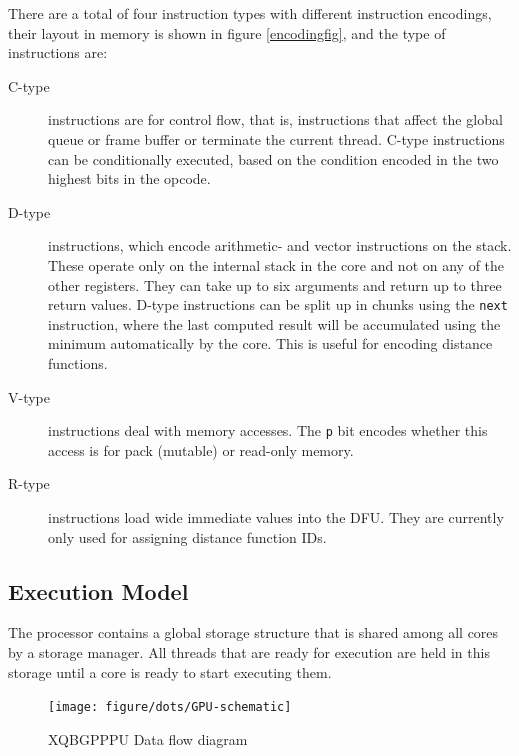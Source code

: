 			There are a total of four instruction types with different
			instruction encodings, their layout in memory is shown in figure
			\ref{encodingfig}, and the type of instructions are:

			\begin{description}
				\item[C-type] instructions are for control flow, that is, 
					instructions that affect the global queue or frame buffer or
					terminate the current thread. C-type instructions can be 
					conditionally executed, based on the condition encoded in
					the two highest bits in the opcode. 

				\item[D-type] instructions, which encode arithmetic- and vector
					instructions on the stack. These operate only on the
					internal stack in the core and not on any of the other
					registers. They can take up to six arguments and return up
					to three return values. D-type instructions can be split up
					in chunks using the \texttt{next} instruction, where the
					last computed result will be accumulated using the minimum
					automatically by the core.  This is useful for encoding
					distance functions.

				\item[V-type] instructions deal with memory accesses. The
					\texttt{p} bit encodes whether this access is for pack
					(mutable) or read-only memory.

				\item[R-type] instructions load wide immediate values into the
					DFU. They are currently only used for assigning distance
					function IDs.
			\end{description}

		\subsection{Execution Model}

			The processor contains a global storage structure that is shared
			among all cores by a storage manager. All threads that are 
			ready for execution are held in this storage until a core is ready 
			to start executing them.

			\begin{figure}[H]
				\centering
				\caption{ XQBGPPPU Data flow diagram }
				\texttt{[image: figure/dots/GPU-schematic]} 
				\vspace{-4pt}
			\end{figure}
	
